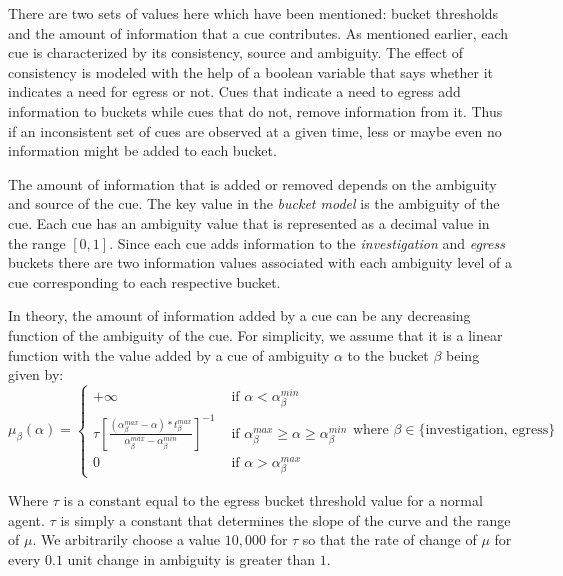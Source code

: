 There are two sets of values here which have been mentioned: bucket thresholds and the amount of information that a cue contributes. As mentioned earlier, each cue is characterized by its consistency, source and ambiguity. The effect of consistency is modeled with the help of a boolean variable that says whether it indicates a need for egress or not. Cues that indicate a need to egress add information to buckets while cues that do not, remove information from it. Thus if an inconsistent set of cues are observed at a given time, less or maybe even no information might be added to each bucket.

The amount of information that is added or removed depends on the ambiguity and source of the cue. The key value in the \emph{bucket model} is the ambiguity of the cue. Each cue has an ambiguity value that is represented as a decimal value in the range $[0,1]$. Since each cue adds information to the \emph{investigation} and \emph{egress} buckets there are two information values associated with each ambiguity level of a cue corresponding to each respective bucket.

In theory, the amount of information added by a cue can be any decreasing function of the ambiguity of the cue. For simplicity, we assume that it is a linear function with the value added by a cue of ambiguity $\alpha$ to the bucket $\beta$ being given by:
\begin{equation}
	\mu_{\beta} (\alpha) =
    \begin{cases}
        +\infty & \mbox{ if } \alpha < \alpha^{min}_{\beta} \\
        {\tau}{\left[\frac{(\alpha^{max}_{\beta}-\alpha)* t^{max}_{\beta}}{\alpha^{max}_{\beta} - \alpha^{min}_{\beta}}\right]}^{-1} & \mbox{ if } \alpha^{max}_{\beta} \geq \alpha \geq \alpha^{min}_{\beta}\\
        0 & \mbox{ if } \alpha > \alpha^{max}_{\beta}
    \end{cases} \mbox{where } \beta \in \{\mbox{investigation, egress}\}
\end{equation}

Where $\tau$ is a constant equal to the egress bucket threshold value for a normal agent. $\tau$ is simply a constant that determines the slope of the curve and the range of $\mu$.  We arbitrarily choose a value $10,000$ for $\tau$ so that the rate of change of $\mu$ for every $0.1$ unit change in ambiguity is greater than $1$.

